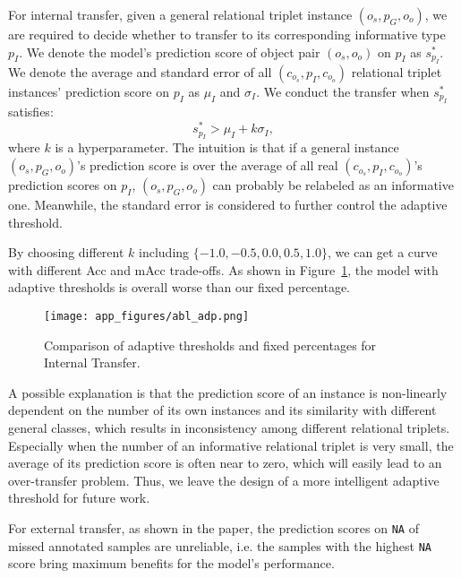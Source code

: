 \documentclass[runningheads]{llncs}
\begin{document}
For internal transfer, given a general relational triplet instance $(o_s, p_G, o_o)$, we are required to decide whether to transfer to its corresponding informative type $p_I$.
We denote the model's prediction score of object pair $(o_s, o_o)$  on $p_I$ as $s_{p_I}^*$.
We denote the average and standard error of all $(c_{o_s}, p_I, c_{o_o})$ relational triplet instances' prediction score on $p_I$ as $\mu_{I}$ and $\sigma_{I}$.
We conduct the transfer when $s_{p_I}^*$ satisfies:
\begin{equation}
    s_{p_I}^* > \mu_{I} +k \sigma_{I},
\end{equation}
where $k$ is a hyperparameter.
The intuition is that if a general instance $(o_s, p_G, o_o)$'s prediction score is over the average of all real $(c_{o_s}, p_I, c_{o_o})$'s prediction scores on $p_I$,  $(o_s, p_G, o_o)$ can probably be relabeled as an informative one.
Meanwhile, the standard error is considered to further control the adaptive threshold.

By choosing different $k$ including $\{-1.0, -0.5, 0.0, 0.5, 1.0\}$, we can get a curve with different Acc and mAcc trade-offs.
As shown in Figure~\ref{fig:data_adp}, the model with adaptive thresholds is overall worse than our fixed percentage.

\begin{figure}[t]
    \centering
    \texttt{[image: app\_figures/abl\_adp.png]}
    \caption{Comparison of adaptive thresholds and fixed percentages for Internal Transfer.}
    \label{fig:data_adp}
\end{figure}

A possible explanation is that the prediction score of an instance is non-linearly dependent on the number of its own instances and its similarity with different general classes, which results in inconsistency among different relational triplets.
Especially when the number of an informative relational triplet is very small, the average of its prediction score is often near to zero, which will easily lead to an over-transfer problem.
Thus, we leave the design of a more intelligent adaptive threshold for future work.

For external transfer, as shown in the paper, the prediction scores on \texttt{NA} of missed annotated samples are unreliable, i.e. the samples with the highest \texttt{NA} score bring maximum benefits for the model's performance. 
\end{document}
